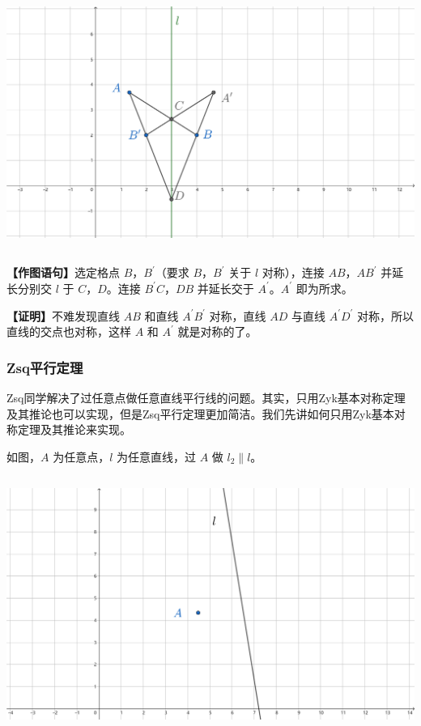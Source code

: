 \documentclass[UTF8]{article}
\begin{document}
\includegraphics[width=5.76806in,height=3.27847in]{media/image8.png}

\textbf{【作图语句】}选定格点 \(B\)，\(B^{'}\)（要求 \(B\)，\(B^{'}\)
关于 \(l\) 对称），连接 \(AB\)，\(AB^{'}\) 并延长分别交 \(l\) 于
\(C\)，\(D\)。连接 \(B^{'}C\)，\(DB\) 并延长交于 \(A^{'}\)。\(A^{'}\)
即为所求。

\textbf{【证明】}不难发现直线 \(AB\) 和直线 \(A^{'}B^{'}\) 对称，直线
\(AD\) 与直线 \(A^{'}D^{'}\) 对称，所以直线的交点也对称，这样 \(A\) 和
\(A^{'}\) 就是对称的了。

\hypertarget{zsqux5e73ux884cux5b9aux7406}{%
\subsubsection{Zsq平行定理}\label{zsqux5e73ux884cux5b9aux7406}}

Zsq同学解决了过任意点做任意直线平行线的问题。其实，只用Zyk基本对称定理及其推论也可以实现，但是Zsq平行定理更加简洁。我们先讲如何只用Zyk基本对称定理及其推论来实现。

如图，\(A\) 为任意点，\(l\) 为任意直线，过 \(A\) 做
\(l_{2} \parallel l\)。

\includegraphics[width=5.76806in,height=3.27847in]{media/image9.png}
\end{document}
